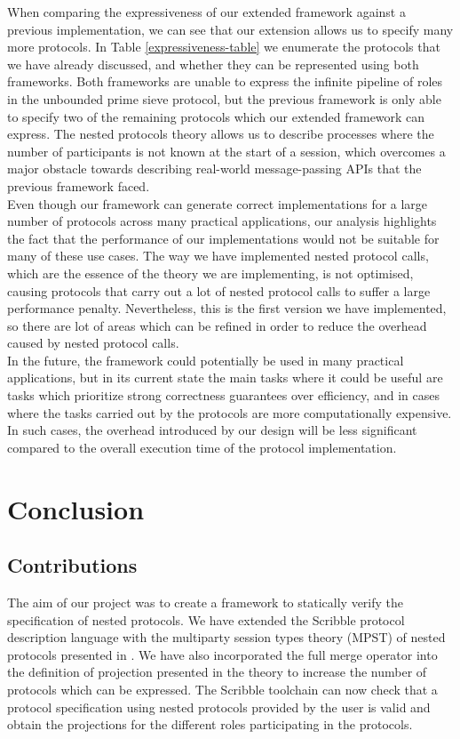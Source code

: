 \documentclass[12pt,twoside]{report}
\begin{document}
When comparing the expressiveness of our extended framework against a previous implementation\cite{parametrictypes}, we can see that our extension allows us to specify many more protocols. In Table \ref{expressiveness-table} we enumerate the protocols that we have already discussed, and whether they can be represented using both frameworks. Both frameworks are unable to express the infinite pipeline of roles in the unbounded prime sieve protocol, but the previous framework is only able to specify two of the remaining protocols which our extended framework can express. The nested protocols theory allows us to describe processes where the number of participants is not known at the start of a session, which overcomes a major obstacle towards describing real-world message-passing APIs that the previous framework faced.\\

Even though our framework can generate correct implementations for a large number of protocols across many practical applications, our analysis highlights the fact that the performance of our implementations would not be suitable for many of these use cases. The way we have implemented nested protocol calls, which are the essence of the theory we are implementing, is not optimised, causing protocols that carry out a lot of nested protocol calls to suffer a large performance penalty. Nevertheless, this is the first version we have implemented, so there are lot of areas which can be refined in order to reduce the overhead caused by nested protocol calls.\\

In the future, the framework could potentially be used in many practical applications, but in its current state the main tasks where it could be useful are tasks which prioritize strong correctness guarantees over efficiency, and in cases where the  tasks carried out by the protocols are more computationally expensive. In such cases, the overhead introduced by our design will be less significant compared to the overall execution time of the protocol implementation.

\chapter{Conclusion}\label{conclusion}
\section{Contributions}
The aim of our project was to create a framework to statically verify the specification of nested protocols. We have extended the Scribble protocol description language\cite{scribble} with the multiparty session types theory (MPST) of nested protocols presented in \cite{nestedprotocols}. We have also incorporated the full merge operator into the definition of projection presented in the theory to increase the number of protocols which can be expressed. The Scribble toolchain can now check that a protocol specification using nested protocols provided by the user is valid and obtain the projections for the different roles participating in the protocols.\\
\end{document}
